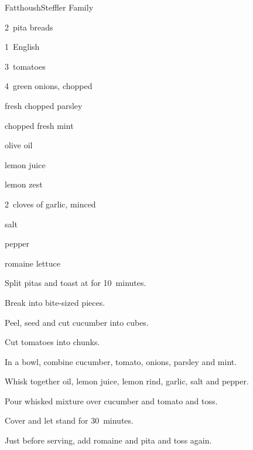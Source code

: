 \begin{recipe}{Fatthoush}{Steffler Family}{}

\begin{ingredients}
\item 2~pita breads
\item 1~English 
\item 3~tomatoes
\item 4~green onions, chopped 
\item \C{\half} fresh chopped parsley
\item \C{\quarter} chopped fresh mint
\item {} olive oil
\item {} lemon juice
\item {} lemon zest
\item 2~cloves of garlic, minced
\item \tp{\half} salt
\item \tp{\half} pepper
\item {} romaine lettuce
\end{ingredients}

\begin{directions}
\item Split pitas and toast at  for 10~minutes.
\item Break into bite-sized pieces.
\item Peel, seed and cut cucumber into  cubes.
\item Cut tomatoes into  chunks.
\item In a bowl, combine cucumber, tomato, onions, parsley and mint.
\item Whisk together oil, lemon juice, lemon rind, garlic, salt and pepper.
\item Pour whisked mixture over cucumber and tomato and toss.
\item Cover and let stand for 30~minutes.
\item Just before serving, add romaine and pita and toss again.
\end{directions}
\end{recipe}

